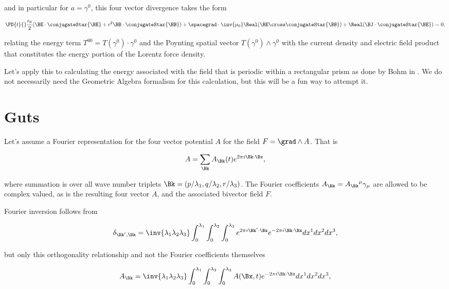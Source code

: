 and in particular for $a = \gamma^0$, this four vector divergence takes the form

\begin{align}\label{eqn:fourierMaxVac:4}
\PD{t}{}\frac{\epsilon_0}{2}(\BE \cdot \conjugateStar{\BE} + c^2 \BB \cdot \conjugateStar{\BB})
+ \spacegrad \cdot \inv{\mu_0} \Real (\BE \cross \conjugateStar{\BB} )
+ \Real( \BJ \cdot \conjugateStar{\BE} ) 
= 0,
\end{align}

relating the energy term $T^{00} = T(\gamma^0) \cdot \gamma^0$ and the Poynting spatial vector $T(\gamma^0) \wedge \gamma^0$ with the current density and electric field product that constitutes the energy portion of the Lorentz force density.

Let's apply this to calculating the energy associated with the field that is periodic within a rectangular prism as done by Bohm in \cite{bohm1989qt}.  We do not necessarily need the Geometric Algebra formalism for this calculation, but this will be a fun way to attempt it.

\section{Guts}

Let's assume a Fourier representation for the four vector potential $A$ for the field $F = \grad \wedge A$.  That is

\begin{align}\label{eqn:fourierMaxVac:5}
A = \sum_{\Bk} A_\Bk(t) e^{2 \pi i \Bk \cdot \Bx},
\end{align}

where summation is over all wave number triplets $\Bk = (p/\lambda_1,q/\lambda_2,r/\lambda_3)$.  The Fourier coefficients $A_\Bk = {A_\Bk}^\mu \gamma_\mu$ are allowed to be complex valued, as is the resulting four vector $A$, and the associated bivector field $F$.

Fourier inversion follows from

\begin{align}\label{eqn:fourierMaxVac:6}
\delta_{\Bk', \Bk} =
\inv{ \lambda_1 \lambda_2 \lambda_3 }
\int_0^{\lambda_1}
\int_0^{\lambda_2}
\int_0^{\lambda_3} 
e^{2 \pi i \Bk' \cdot \Bx} 
e^{-2 \pi i \Bk \cdot \Bx} dx^1 dx^2 dx^3,
\end{align}

but only this orthogonality relationship and not the Fourier coefficients themselves

\begin{align}\label{eqn:fourierMaxVac:7}
A_\Bk = 
\inv{ \lambda_1 \lambda_2 \lambda_3 }
\int_0^{\lambda_1}
\int_0^{\lambda_2}
\int_0^{\lambda_3} A(\Bx, t) e^{-2 \pi i \Bk \cdot \Bx} dx^1 dx^2 dx^3,
\end{align}

